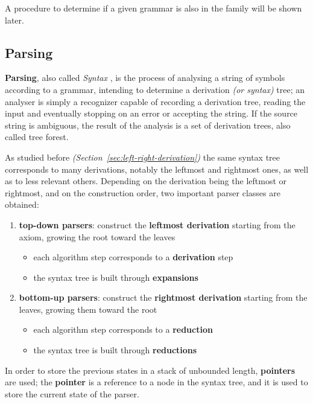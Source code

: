\documentclass[english]{article}
\begin{document}
A procedure to determine if a given \CF grammar is also in the \DET family will be shown later. %

\subsection{Parsing}
\label{sec:parsing}

\textbf{Parsing}, also called \textit{Syntax }, is the process of analysing a string of symbols according to a grammar, intending to determine a derivation \textit{(or syntax)} tree;
an analyser is simply a recognizer capable of recording a derivation tree, reading the input and eventually stopping on an error or accepting the string.
If the source string is ambiguous, the result of the analysis is a set of derivation trees, also called tree forest.

As studied before \textit{(Section~\ref{sec:left-right-derivation})}
the same syntax tree corresponds to many derivations, notably the leftmost and rightmost ones, as well as to less relevant others.
Depending on the derivation being the leftmost or rightmost, and on the construction order, two important parser classes are obtained:

\begin{enumerate}
  \item \textbf{top-down parsers}: construct the \textbf{leftmost derivation} starting from the axiom, growing the root toward the leaves
        \begin{itemize}
          \item each algorithm step corresponds to a \textbf{derivation} step
          \item the syntax tree is built through \textbf{expansions}
        \end{itemize}
  \item \textbf{bottom-up parsers}: construct the \textbf{rightmost derivation} starting from the leaves, growing them toward the root
        \begin{itemize}
          \item each algorithm step corresponds to a \textbf{reduction}
          \item the syntax tree is built through \textbf{reductions}
        \end{itemize}
\end{enumerate}

\bigskip
In order to store the previous states in a stack of unbounded length, \textbf{pointers} are used;
the \textbf{pointer} is a reference to a node in the syntax tree, and it is used to store the current state of the parser.
\end{document}
